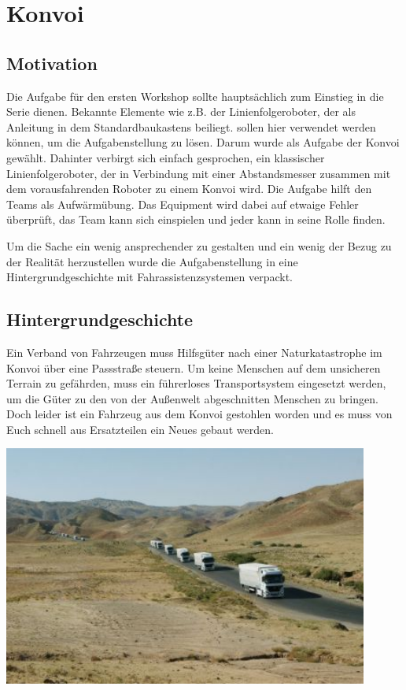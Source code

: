 \chapter{Konvoi}

\section{Motivation}
Die Aufgabe für den ersten Workshop sollte hauptsächlich zum Einstieg in die Serie dienen. Bekannte Elemente wie z.B. der Linienfolgeroboter, der als Anleitung in dem Standardbaukastens beiliegt. sollen hier verwendet werden können, um die Aufgabenstellung zu lösen. Darum wurde als Aufgabe der Konvoi gewählt. Dahinter verbirgt sich einfach gesprochen, ein klassischer Linienfolgeroboter, der in Verbindung mit einer Abstandsmesser zusammen mit dem vorausfahrenden Roboter zu einem Konvoi wird. Die Aufgabe hilft den Teams als Aufwärmübung. Das Equipment wird dabei auf etwaige Fehler überprüft, das Team kann sich einspielen und jeder kann in seine Rolle finden.
    
Um die Sache ein wenig ansprechender zu gestalten und ein wenig der Bezug zu der Realität herzustellen wurde die Aufgabenstellung in eine Hintergrundgeschichte mit Fahrassistenzsystemen verpackt.
\clearpage
\section{Hintergrundgeschichte}
Ein Verband von Fahrzeugen muss Hilfsgüter nach einer Naturkatastrophe im Konvoi über eine Passstraße steuern. Um keine Menschen auf dem unsicheren Terrain zu gefährden, muss ein führerloses Transportsystem eingesetzt werden, um die Güter zu den von der Außenwelt abgeschnitten Menschen zu bringen. Doch leider ist ein Fahrzeug aus dem Konvoi gestohlen worden und es muss von Euch schnell aus Ersatzteilen ein Neues gebaut werden.

\begin{capfigure}[Konvoi]
	\includegraphics[width=12cm]{images/konvoi}
\end{capfigure}
